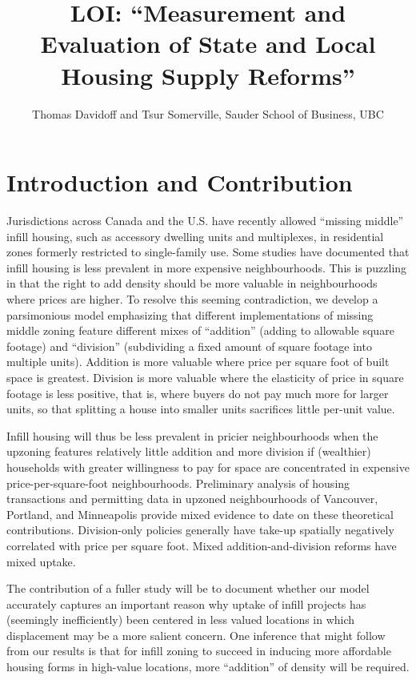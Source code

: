 \documentclass[12pt]{article}
\begin{document}
\title{LOI: ``Measurement and Evaluation of State and Local Housing Supply Reforms''}
\author{Thomas Davidoff and Tsur Somerville, Sauder School of Business, UBC}
\maketitle

\section{Introduction and Contribution}

Jurisdictions across Canada and the U.S. have recently allowed
``missing middle'' infill housing, such as accessory dwelling units and
multiplexes, in residential zones formerly restricted to single-family
use. Some studies have documented that infill housing is less prevalent
in more expensive neighbourhoods. This is puzzling in that the right to
add density should be more valuable in neighbourhoods where prices are
higher. To resolve this seeming contradiction, we develop a
parsimonious model emphasizing that different implementations of
missing middle zoning feature different mixes of ``addition'' (adding
to allowable square footage) and ``division'' (subdividing a fixed
amount of square footage into multiple units). Addition is more
valuable where price per square foot of built space is greatest.
Division is more valuable where the elasticity of price in square
footage is less positive, that is, where buyers do not pay much more for larger
units, so that splitting a house into smaller units sacrifices little per-unit
value.  

Infill housing will thus be less prevalent in pricier neighbourhoods when the
upzoning features relatively little addition and more division if (wealthier)
households with greater willingness to pay for space  are concentrated in
expensive price-per-square-foot neighbourhoods. Preliminary analysis of housing
transactions and permitting data in upzoned neighbourhoods of Vancouver,
Portland, and Minneapolis provide mixed evidence to date on these theoretical
contributions.  Division-only policies generally have take-up spatially
negatively correlated with price per square foot. Mixed addition-and-division
reforms have mixed uptake. 

The contribution of a fuller study will be to document whether our model
accurately captures an important reason why uptake of infill projects has
(seemingly inefficiently) been centered in less valued locations in which
displacement may be a more salient concern. One inference that might follow
from our results is that for infill zoning to succeed in inducing more
affordable housing forms in high-value locations, more ``addition'' of density
will be required.
\end{document}
